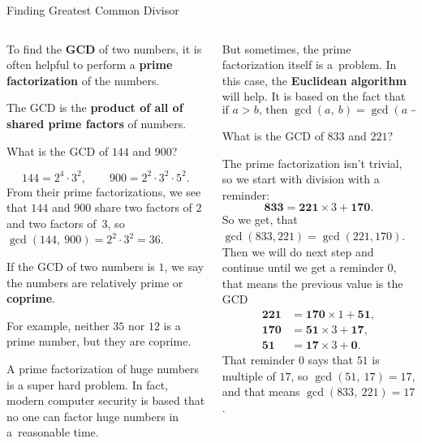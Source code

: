 \documentclass[9pt,aspectratio=169]{beamer}
\begin{document}
\begin{frame}{Finding Greatest Common Divisor}
  \begin{columns}[T]
    \begin{column}{0.5\textwidth}
        To find the \textbf{GCD} of two numbers, it is often helpful to perform a \textbf{prime factorization} of the numbers.

      \begin{definition}
        The GCD is the \textbf{product of all of shared prime factors} of numbers.
      \end{definition}

      \begin{problem}
        What is the GCD of $144$ and $900$?
      \end{problem}
      \vspace*{-1.8ex}
      \[ 144 = 2^4 \cdot 3^2, \qquad 900 = 2^2 \cdot 3^2 \cdot 5^2. \]
      From their prime factorizations, we see that $144$ and $900$ share two factors of $2$ and two factors of~$3$, so $\gcd(144,\ 900) = 2^2 \cdot 3^2 = 36$.

      \begin{example}
        If the GCD of two numbers is $1$, we say the numbers are relatively prime or \textbf{coprime}.                 
      \end{example}
      For example, neither $35$ nor $12$ is a prime number, but they are coprime.\smallskip 

      A prime factorization of huge numbers is a super hard problem. In fact, modern computer security is based that no one can factor huge numbers in a~reasonable time.
    \end{column}
    \begin{column}{0.5\textwidth}
      But sometimes, the prime factorization itself is a~problem. In this case, the \textbf{Euclidean algorithm} will help. It is based on the fact that     
      \[
        \text{if }a > b\text{, then }\gcd(a,\ b) = \gcd(a − k \cdot b, b).
      \]\vspace*{-0.9\baselineskip}
      \begin{problem}
        What is the GCD of $833$ and $221$?        
      \end{problem}

      The prime factorization isn’t trivial, so we start with division with a reminder:
      \[ \mathbf{833} = \mathbf{221} × 3 + \mathbf{170}. \]
      So we get, that $\gcd(833, 221) = \gcd(221, 170)$. Then we will do next step and continue until we get a reminder $0$, that means the previous value is the GCD
      \begin{align*}
        \mathbf{221} &= \mathbf{170} × 1 + \mathbf{51}, \\
        \mathbf{170} &= \mathbf{51} × 3 + \mathbf{17}, \\
        \mathbf{51} &= \mathbf{17} × 3 + \mathbf{0}.                 
      \end{align*}
      That reminder $0$ says that $51$ is multiple of $17$, so $\gcd(51,\ 17) = 17$, and that means $\gcd(833,\ 221) = 17$. 
    \end{column}
  \end{columns}
\end{frame}
\end{document}
